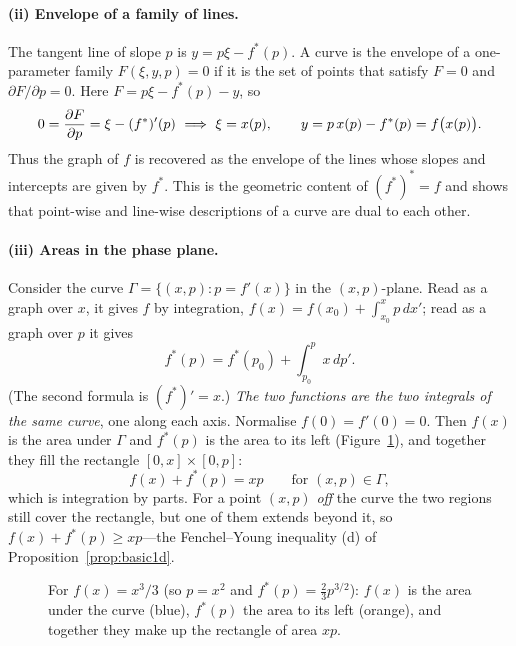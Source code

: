 \paragraph{(ii) Envelope of a family of lines.}
The tangent line of slope $p$ is $y=p\xi-f^*(p)$.  A curve is the envelope of
a one-parameter family $F(\xi,y,p)=0$ if it is the set of points that satisfy
$F=0$ and $\partial F/\partial p=0$.  Here $F=p\xi-f^*(p)-y$, so
\[
  0=\pd{F}{p}=\xi-(f^*)'(p)\ \Longrightarrow\ \xi=x(p),\qquad
  y=p\,x(p)-f^*(p)=f\bigl(x(p)\bigr).
\]
Thus the graph of $f$ is recovered as the envelope of the lines whose
slopes and intercepts are given by $f^*$.  This is the geometric content of
$(f^*)^*=f$ and shows that point-wise and line-wise descriptions of a curve
are dual to each other.

\paragraph{(iii) Areas in the phase plane.}
Consider the curve $\Gamma=\{(x,p):p=f'(x)\}$ in the $(x,p)$-plane.  Read as
a graph over $x$, it gives $f$ by integration,
$f(x)=f(x_0)+\int_{x_0}^{x}p\,d x'$; read as a graph over $p$ it gives
\[
  f^*(p)=f^*(p_0)+\int_{p_0}^{p}x\,d p' .
\]
(The second formula is $(f^*)'=x$.)  \emph{The two functions are the two
integrals of the same curve}, one along each axis.  Normalise $f(0)=f'(0)=0$.
Then $f(x)$ is the area under $\Gamma$ and $f^*(p)$ is the area to its left
(Figure~\ref{fig:areas}), and together they fill the rectangle $[0,x]\times[0,p]$:
\[
  f(x)+f^*(p)=xp\qquad\text{for }(x,p)\in\Gamma,
\]
which is integration by parts.  For a point $(x,p)$ \emph{off} the curve the
two regions still cover the rectangle, but one of them extends beyond it, so
$f(x)+f^*(p)\ge xp$---the Fenchel--Young inequality (d) of
Proposition~\ref{prop:basic1d}.

\begin{figure}[ht]
\centering
{}
\caption{For $f(x)=x^3/3$ (so $p=x^2$ and $f^*(p)=\tfrac23p^{3/2}$): $f(x)$ is
the area under the curve (blue), $f^*(p)$ the area to its left (orange), and
together they make up the rectangle of area $xp$.}
\label{fig:areas}
\end{figure}

